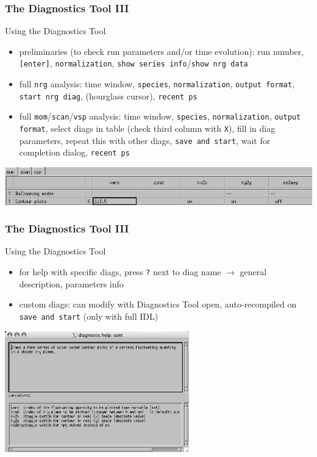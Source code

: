\documentclass[9pt]{beamer}
\begin{document}
\begin{frame}[fragile]
  \frametitle{The Diagnostics Tool III}

\begin{block}{Using the Diagnostics Tool}

\begin{itemize}
\item preliminaries (to check run parameters and/or time evolution): run number,
\verb|[enter]|, \verb|normalization|, \verb|show series info|/\verb|show nrg data|
\item full \verb|nrg| analysis: time window, \verb|species|, \verb|normalization|,
\verb|output format|, \verb|start nrg diag|, (hourglass cursor), \verb|recent ps|
\item full \verb|mom|/\verb|scan|/\verb|vsp| analysis: time window, \verb|species|,
\verb|normalization|, \verb|output format|, select diags in table
(check third column with \verb|X|), fill in diag parameters, repeat this with other diags,
\verb|save and start|, wait for completion dialog, \verb|recent ps|
\end{itemize}

\includegraphics[width=14cm]{figs/diag_table_cont.png}

\end{block}

\end{frame}


\begin{frame}[fragile]
  \frametitle{The Diagnostics Tool III}

\begin{block}{Using the Diagnostics Tool}

\begin{itemize}
\item for help with specific diags, press \verb|?| next to diag name $\rightarrow$
general description, parameters info
\item custom diags: can modify with Diagnostics Tool open, auto-recompiled on
\verb|save and start| (only with full IDL)
\end{itemize}

\includegraphics[width=8cm]{figs/diag_cont_help.png}

\end{block}

\end{frame}
\end{document}
